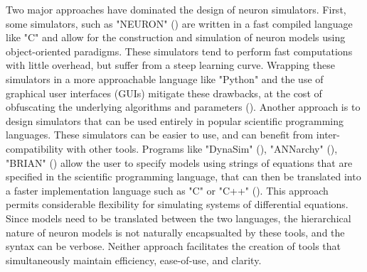 \documentclass{frontiersSCNS} %
\begin{document}
Two major approaches have dominated the design of neuron simulators. First, some simulators, such as "NEURON" (\cite{hinesNEURONSimulationEnvironment1997}) are written in a fast compiled language like "C" and allow for the construction and simulation of neuron models using object-oriented paradigms. These simulators tend to perform fast computations with little overhead, but suffer from a steep learning curve. Wrapping these simulators in a more approachable language like "Python" and the use of graphical user interfaces (GUIs) mitigate these drawbacks, at the cost of obfuscating the underlying algorithms and parameters (\cite{bretteSimulationNetworksSpiking2007, hinesNEURONPython2009}). Another approach is to design simulators that can be used entirely in popular scientific programming languages. These simulators can be easier to use, and can benefit from inter-compatibility with other tools. Programs like "DynaSim" (\cite{sherfeyDynaSimMATLABToolbox2018}), "ANNarchy" (\cite{vitayANNarchyCodeGeneration2015}), "BRIAN" (\cite{stimbergBrianSecondComing2013}) allow the user to specify models using strings of equations that are specified in the scientific programming language, that can then be translated into a faster implementation language such as "C" or "C++" (\cite{stimbergEquationorientedSpecificationNeural2014}). This approach permits considerable flexibility for simulating systems of differential equations. Since models need to be translated between the two languages, the hierarchical nature of neuron models is not naturally encapsualted by these tools, and the syntax can be verbose. Neither approach facilitates the creation of tools that simultaneously maintain efficiency, ease-of-use, and clarity.
\end{document}
